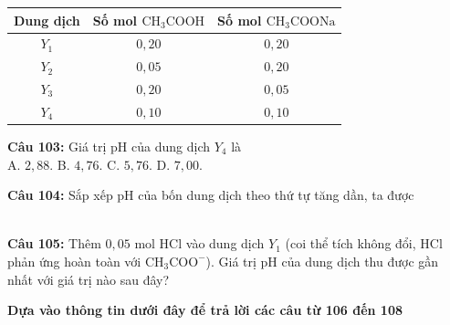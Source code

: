 \documentclass[12pt,a4paper]{article}
\begin{document}
\begin{center}
\begin{tabular}{|c|c|c|}
\hline
Dung dịch & Số mol $\mathrm{CH_3COOH}$ & Số mol $\mathrm{CH_3COONa}$ \\ \hline
$Y_1$ & $0{,}20$ & $0{,}20$ \\ \hline
$Y_2$ & $0{,}05$ & $0{,}20$ \\ \hline
$Y_3$ & $0{,}20$ & $0{,}05$ \\ \hline
$Y_4$ & $0{,}10$ & $0{,}10$ \\ \hline
\end{tabular}
\end{center}

\par\nobreak


\noindent \textbf{Câu 103:} Giá trị pH của dung dịch $Y_4$ là\\
\noindent A. $2{,}88$. \hfill B. $4{,}76$. \hfill C. $5{,}76$. \hfill D. $7{,}00$.



\vspace{0.3cm}

\noindent \textbf{Câu 104:} Sắp xếp pH của bốn dung dịch theo thứ tự tăng dần, ta được\\
\noindent{}\\
\noindent{}



\vspace{0.3cm}

\noindent \textbf{Câu 105:} Thêm $0{,}05$ mol HCl vào dung dịch $Y_1$ (coi thể tích không đổi, HCl phản ứng hoàn toàn với $\mathrm{CH_3COO^-}$). Giá trị pH của dung dịch thu được gần nhất với giá trị nào sau đây?\\
\noindent{}



\vspace{0.5cm}
\noindent\textbf{Dựa vào thông tin dưới đây để trả lời các câu từ 106 đến 108}%
\end{document}
